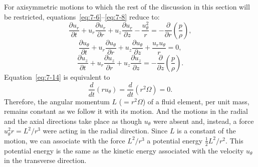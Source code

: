 For axisymmetric motions to which the rest of the discussion in this
section will be restricted, equations~\eqref{eq:7-6}--\eqref{eq:7-8} reduce to:
\begin{equation}
\label{eq:7-13}
\frac{\partial u_r}{\partial t}
+ u_r \frac{\partial u_r}{\partial r}
+ u_z \frac{\partial u_r}{\partial z}
- \frac{u_\theta^2}{r}
= -\frac{\partial}{\partial r}\!\left(\frac{p}{\rho}\right),
\end{equation}
\begin{equation}
\label{eq:7-14}
\frac{\partial u_\theta}{\partial t}
+ u_r \frac{\partial u_\theta}{\partial r}
+ u_z \frac{\partial u_\theta}{\partial z}
+ \frac{u_r u_\theta}{r} = 0,
\end{equation}
\begin{equation}
\label{eq:7-15}
\frac{\partial u_z}{\partial t}
+ u_r \frac{\partial u_z}{\partial r}
+ u_z \frac{\partial u_z}{\partial z}
= -\frac{\partial}{\partial z}\!\left(\frac{p}{\rho}\right).
\end{equation}
Equation~\eqref{eq:7-14} is equivalent to
\begin{equation}
\label{eq:7-16}
\frac{d}{dt}(r u_\theta) = \frac{d}{dt}(r^2\Omega) = 0.
\end{equation}
Therefore, the angular momentum $L$ ($= r^2\Omega$) of a fluid element, per unit
mass, remains constant as we follow it with its motion.  And the motions
in the radial and the axial directions take place as though $u_\theta$ were absent
and, instead, a force $u_\theta^2 r = L^2/r^3$ were acting in the radial direction.  Since
$L$ is a constant of the motion, we can associate with the force $L^2/r^3$ a
potential energy $\frac{1}{2}L^2/r^2$.  This potential energy is the same as the
kinetic energy associated with the velocity $u_\theta$ in the transverse direction.

